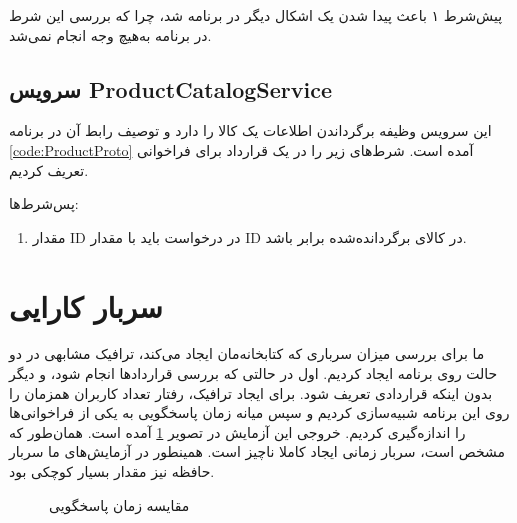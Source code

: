 پیش‌شرط ۱ باعث پیدا شدن یک اشکال دیگر در برنامه شد، چرا که بررسی این شرط در برنامه به‌هیچ وجه انجام نمی‌شد.

\subsection{
سرویس ProductCatalogService
}

این سرویس وظیفه برگرداندن اطلاعات یک کالا را دارد و توصیف رابط آن در برنامه
\ref{code:ProductProto}
آمده است. شرط‌های زیر را در یک قرارداد برای فراخوانی
تعریف کردیم.

پس‌شرط‌ها:
\begin{enumerate}
\item
مقدار ID در درخواست باید با مقدار ID در کالای برگردانده‌شده برابر باشد.
\end{enumerate}

\singlespacing
\begin{figure}
	\begin{LTR}
		
	\end{LTR}
\end{figure}
\doublespacing


\section{سربار کارایی}
ما برای بررسی میزان سرباری که کتابخانه‌مان ایجاد می‌کند، ترافیک مشابهی در دو حالت روی برنامه ایجاد کردیم. اول در حالتی که بررسی قراردادها انجام شود، و دیگر بدون اینکه قراردادی تعریف شود. برای ایجاد ترافیک، رفتار تعداد کاربران همزمان را روی این برنامه شبیه‌سازی کردیم و سپس میانه زمان پاسخگویی به یکی از فراخوانی‌ها را اندازه‌گیری کردیم. خروجی این آزمایش در تصویر
\ref{fig:performance}
آمده است. همان‌طور که مشخص است، سربار زمانی ایجاد کاملا ناچیز است. همینطور در آزمایش‌های ما سربار حافظه نیز مقدار بسیار کوچکی بود.

\begin{figure}[t]
\centering
{}
\caption{مقایسه زمان پاسخگویی}
\label{fig:performance}
\end{figure}
